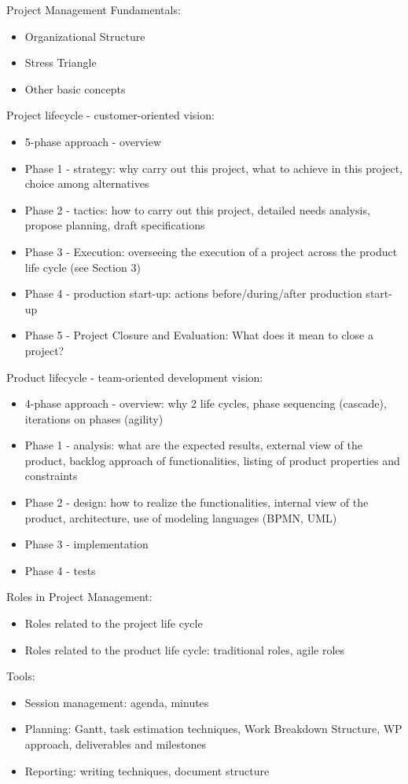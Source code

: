Project Management Fundamentals:
\begin{itemize}
    \item Organizational Structure
    \item Stress Triangle
    \item Other basic concepts
\end{itemize}
Project lifecycle - customer-oriented vision:
\begin{itemize}
    \item 5-phase approach - overview
    \item Phase 1 - strategy: why carry out this project, what to achieve in this project, choice among alternatives
    \item Phase 2 - tactics: how to carry out this project, detailed needs analysis, propose planning, draft specifications
    \item Phase 3 - Execution: overseeing the execution of a project across the product life cycle (see Section 3)
    \item Phase 4 - production start-up: actions before/during/after production start-up
    \item Phase 5 - Project Closure and Evaluation: What does it mean to close a project?
\end{itemize}
\pagebreak
Product lifecycle - team-oriented development vision:
\begin{itemize}
    \item 4-phase approach - overview: why 2 life cycles, phase sequencing (cascade), iterations on phases (agility)
    \item Phase 1 - analysis: what are the expected results, external view of the product, backlog approach of functionalities, listing of product properties and constraints
    \item Phase 2 - design: how to realize the functionalities, internal view of the product, architecture, use of modeling languages (BPMN, UML)
    \item Phase 3 - implementation
    \item Phase 4 - tests
\end{itemize}
Roles in Project Management:
\begin{itemize}
    \item Roles related to the project life cycle
    \item Roles related to the product life cycle: traditional roles, agile roles
\end{itemize}
Tools:
\begin{itemize}
    \item Session management: agenda, minutes
    \item Planning: Gantt, task estimation techniques, Work Breakdown Structure, WP approach, deliverables and milestones
    \item Reporting: writing techniques, document structure
\end{itemize}